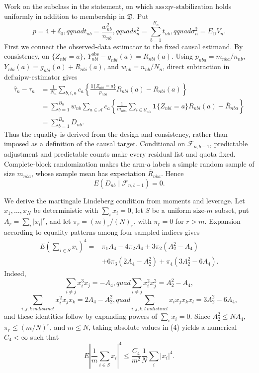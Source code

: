 Work on the subclass in the statement, on which \(\text{ass:qv-stabilization}\) holds uniformly in addition to membership in \(\mathfrak D\). Put
\[
p=4+\delta_0,qquad t_{nb}=\frac{w_{nb}^2}{n_{nb}},qquad
s_n^2=\sum_{b=1}^{B_n}t_{nb},qquad \sigma_n^2=E_{\mathbb D}V_n.
\tag{1}
\]
First we connect the observed-data estimator to the fixed causal estimand. By consistency, on \(\{Z_{nbi}=a\}\),
\(Y_{nbi}^{\mathrm{obs}}-g_{nbi}(a)=R_{nbi}(a)\). Using
\(p_{nba}=m_{nba}/n_{nb}\), \(Y_{nbi}(a)=g_{nbi}(a)+R_{nbi}(a)\), and
\(w_{nb}=n_{nb}/N_n\), direct subtraction in \(\text{def:aipw-estimator}\) gives
\[
\begin{aligned}
\widehat\tau_n-\tau_n
&=\frac1{N_n}\sum_{b,i,a}c_a\left\{
\frac{\mathbf1\{Z_{nbi}=a\}}{p_{nba}}R_{nbi}(a)-R_{nbi}(a)\right\}\\
&=\sum_{b=1}^{B_n}w_{nb}\sum_{a\in\mathcal A}c_a
\left\{\frac1{m_{nba}}\sum_{i\in\mathcal U_{nb}}
\mathbf1\{Z_{nbi}=a\}R_{nbi}(a)-\bar R_{nba}\right\}\\
&=\sum_{b=1}^{B_n}D_{nb}.
\end{aligned}
\tag{2}
\]
Thus the equality is derived from the design and consistency, rather than imposed as a definition of the causal target. Conditional on \(\mathcal F_{n,b-1}\), predictable adjustment and predictable counts make every residual list and quota fixed. Complete-block randomization makes the arm-\(a\) labels a simple random sample of size \(m_{nba}\), whose sample mean has expectation \(\bar R_{nba}\). Hence
\[
E(D_{nb}\mid\mathcal F_{n,b-1})=0.
\tag{3}
\]

We derive the martingale Lindeberg condition from moments and leverage. Let \(x_1,\ldots,x_N\) be deterministic with \(\sum_ix_i=0\), let \(S\) be a uniform size-\(m\) subset, put \(A_r=\sum_i|x_i|^r\), and let \(\pi_r=(m)_r/(N)_r\), with \(\pi_r=0\) for \(r>m\). Expansion according to equality patterns among four sampled indices gives
\[
\begin{aligned}
E\left(\sum_{i\in S}x_i\right)^4
={}&\pi_1A_4-4\pi_2A_4+3\pi_2(A_2^2-A_4)\\
&+6\pi_3(2A_4-A_2^2)+\pi_4(3A_2^2-6A_4).
\end{aligned}
\tag{4}
\]
Indeed,
\[
\sum_{i\ne j}x_i^3x_j=-A_4,quad
\sum_{i\ne j}x_i^2x_j^2=A_2^2-A_4,
\]
\[
\sum_{i,j,k\ {
m distinct}}x_i^2x_jx_k=2A_4-A_2^2,quad
\sum_{i,j,k,l\ {
m distinct}}x_ix_jx_kx_l=3A_2^2-6A_4,
\tag{5}
\]
and these identities follow by expanding powers of \(\sum_ix_i=0\). Since
\(A_2^2\le NA_4\), \(\pi_r\le(m/N)^r\), and \(m\le N\), taking absolute values in (4) yields a numerical \(C_4<\infty\) such that
\[
E\left|\frac1m\sum_{i\in S}x_i\right|^4
\le\frac{C_4}{m^2}\frac1N\sum_i|x_i|^4.
\tag{6}
\]


